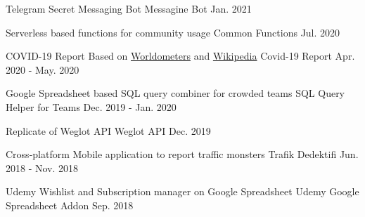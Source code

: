 

\begin{cventries}

  \cventry
    {Telegram Secret Messaging Bot} %
    {Messagine Bot} %
    {} %
    {Jan. 2021} %
    {}

  \cventry
    {Serverless based functions for community usage} %
    {Common Functions} %
    {} %
    {Jul. 2020} %
    {}

  \cventry
    {COVID-19 Report Based on \href{https://www.worldometers.info/coronavirus}{Worldometers} and \href{https://en.wikipedia.org/wiki/COVID-19_pandemic}{Wikipedia}} %
    {Covid-19 Report} %
    {} %
    {Apr. 2020 - May. 2020} %
    {}

  \cventry
    {Google Spreadsheet based SQL query combiner for crowded teams} %
    {SQL Query Helper for Teams} %
    {} %
    {Dec. 2019 - Jan. 2020} %
    {}

  \cventry
    {Replicate of Weglot API} %
    {Weglot API} %
    {} %
    {Dec. 2019} %
    {}

  \cventry
    {Cross-platform Mobile application to report traffic monsters} %
    {Trafik Dedektifi} %
    {} %
    {Jun. 2018 - Nov. 2018} %
    {}

  \cventry
    {Udemy Wishlist and Subscription manager on Google Spreadsheet} %
    {Udemy Google Spreadsheet Addon} %
    {} %
    {Sep. 2018} %
    {}


\end{cventries}

